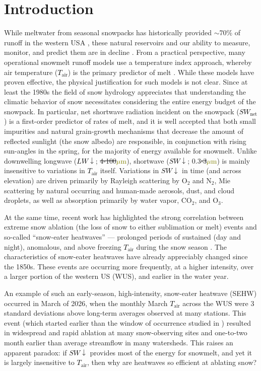 \documentclass[draft]{agujournal2019}
\newcommand{\tair}{\textcolor{black}{$T_{\mathrm{air}}$}\xspace}
\newcommand{\lwdn}{\textcolor{black}{$LW\downarrow$}\xspace}
\newcommand{\swnet}{\textcolor{black}{$SW_{\mathrm{net}}$}\xspace}
\newcommand{\swdn}{\textcolor{black}{$SW\downarrow$}\xspace}
\newcommand{\um}{\textcolor{olive}{$\mu$m}\xspace}
\providecommand{\DIFadd}[1]{{\protect\color{blue}\uwave{#1}}} %
\providecommand{\DIFdel}[1]{{\protect\color{red}\sout{#1}}}                      %
\providecommand{\DIFaddbegin}{} %
\providecommand{\DIFaddend}{} %
\providecommand{\DIFdelbegin}{} %
\providecommand{\DIFdelend}{} %
\begin{document}
\section{Introduction}
While meltwater from seasonal snowpacks has historically provided $\sim$70\% of runoff in the western USA \cite{Li2017-dj}, these natural reservoirs and our ability to measure, monitor, and predict them are in decline \cite{Hale2023-kx, Cowherd2024-zm}.
From a practical perspective, many operational snowmelt runoff models use a temperature index approach, whereby air temperature (\tair) is the primary predictor of melt \cite{Anderson1973-jx}.
While these models have proven effective, the physical justification for such models is not clear.
Since at least the 1980s the field of snow hydrology appreciates that understanding the climatic behavior of snow necessitates considering the entire energy budget of the snowpack.
In particular, net shortwave radiation incident on the snowpack (\swnet) is a first-order predictor of rates of melt, and it is well accepted that both small impurities \cite{Deems2013-vv} and natural grain-growth mechanisms that decrease the amount of reflected sunlight (the snow albedo) are responsible, in conjunction with rising sun-angles in the spring, for the majority of energy available for snowmelt.
Unlike downwelling longwave (\lwdn; \DIFdelbegin \DIFdel{4-100}\DIFdelend \DIFaddbegin \DIFadd{4--100}\DIFaddend \um), shortwave (\swdn; 0.3\DIFdelbegin \DIFdel{-3}\DIFdelend \DIFaddbegin \DIFadd{--3}\DIFaddend \um) is mainly insensitive to variations in \tair itself.
Variations in \swdn in time (and across elevation) are driven primarily by Rayleigh scattering by O$_2$ and N$_2$, Mie scattering by natural occurring and human-made aerosols, dust, and cloud droplets, as well as absorption primarily by water vapor, CO$_2$, and O$_3$.

At the same time, recent work has highlighted the strong correlation between extreme snow ablation (the loss of snow to either sublimation or melt) events and so-called ``snow-eater heatwaves'' --- prolonged periods of sustained (day and night), anomalous, and above freezing \tair during the snow season \cite{Rhoades2026-jm}.
The characteristics of snow-eater heatwaves have already appreciably changed since the 1850s.
These events are occurring more frequently, at a higher intensity, over a larger portion of the western US (WUS), and earlier in the water year.

An example of such an early-season, high-intensity, snow-eater heatwave (SEHW) occurred in March of 2026, when the monthly March \tair across the WUS were 3 standard deviations above long-term averages observed at many stations. 
This event (which started earlier than the window of occurrence studied in ) resulted in widespread and rapid ablation at many snow-observing sites and one-to-two month earlier than average streamflow in many watersheds.
This raises an apparent paradox: if \swdn provides most of the energy for snowmelt, and yet it is largely insensitive to \tair, then why are heatwaves so efficient at ablating snow?
\end{document}
